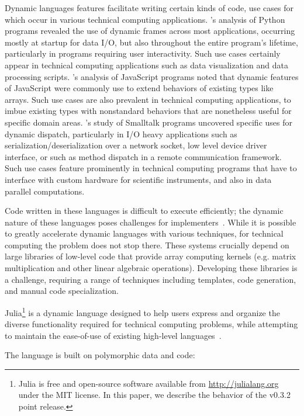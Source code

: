 Dynamic languages features facilitate writing certain kinds of code, use cases
for which occur in various technical computing applications.
\cite{Holkner2009}'s analysis of Python programs revealed the use of dynamic
frames across most applications, occurring mostly at startup for data I/O, but
also throughout the entire program's lifetime, particularly in programs
requiring user interactivity. Such use cases certainly appear in technical
computing applications such as data visualization and data processing scripts.
\cite{Richards2010}'s analysis of JavaScript programs noted that dynamic
features of JavaScript were commonly use to extend behaviors of existing types
like arrays. Such use cases are also prevalent in technical computing
applications, to imbue existing types with nonstandard behaviors that are
nonetheless useful for specific domain areas. \cite{Callau2012}'s study of
Smalltalk programs uncovered specific uses for dynamic dispatch, particularly
in I/O heavy applications such as serialization/deserialization over a network
socket, low level device driver interface, or such as method dispatch in a
remote communication framework. Such use cases feature prominently in
technical computing programs that have to interface with custom hardware for
scientific instruments, and also in data parallel computations.

Code written in these languages is difficult to execute efficiently;
the dynamic nature of these languages poses challenges for
implementers~\cite{Joisha2001,Joisha2006,Seljebotn2009}. While it is possible
to greatly accelerate dynamic languages with various techniques, for
technical computing the problem does not stop there. These systems
crucially depend on large libraries of low-level code that provide array
computing kernels (e.g. matrix multiplication and other linear algebraic
operations). Developing these libraries is a challenge, requiring a range of
techniques including templates, code generation, and manual code
specialization.

Julia\footnote{Julia is free and open-source software available from
\url{http://julialang.org} under the MIT license. In this paper, we describe
the behavior of the v0.3.2 point release.} is a dynamic language designed to
help users express and organize the diverse functionality required for technical computing problems, while
attempting to maintain the ease-of-use of existing high-level
languages~\cite{Bezanson2012,Bezanson2014b}.

The language is built on polymorphic data and code:

